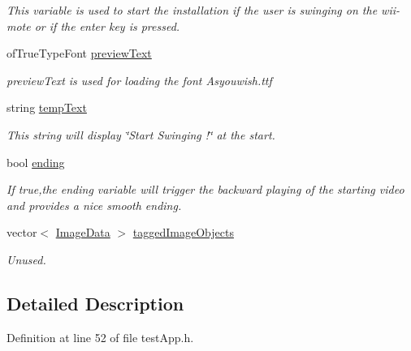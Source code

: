 \begin{DoxyCompactItemize}
\begin{DoxyCompactList}\small\item\em This variable is used to start the installation if the user is swinging on the wii-\/mote or if the enter key is pressed. \end{DoxyCompactList}\item 
of\-True\-Type\-Font \hyperlink{classtest_app_af5b1af55af2256ef3751de075fc7a9cc}{preview\-Text}
\begin{DoxyCompactList}\small\item\em preview\-Text is used for loading the font Asyouwish.\-ttf \end{DoxyCompactList}\item 
string \hyperlink{classtest_app_ad9a4beab6f2e0f13d32b00b502e89bdc}{temp\-Text}
\begin{DoxyCompactList}\small\item\em This string will display \char`\"{}\-Start Swinging !\char`\"{} at the start. \end{DoxyCompactList}\item 
bool \hyperlink{classtest_app_acf09303bc452d2a38098f6bf94655408}{ending}
\begin{DoxyCompactList}\small\item\em If true,the ending variable will trigger the backward playing of the starting video and provides a nice smooth ending. \end{DoxyCompactList}\item 
vector$<$ \hyperlink{struct_image_data}{Image\-Data} $>$ \hyperlink{classtest_app_af65c8dc2f4620bfe7fdf6a39043cb48d}{tagged\-Image\-Objects}
\begin{DoxyCompactList}\small\item\em Unused. \end{DoxyCompactList}\end{DoxyCompactItemize}


\subsection{Detailed Description}


Definition at line 52 of file test\-App.\-h.



